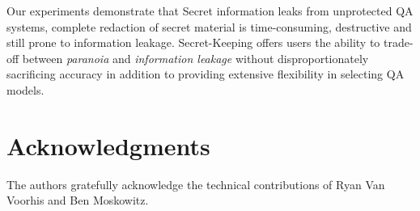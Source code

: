 \documentclass[11pt]{article}
\begin{document}
Our experiments demonstrate that Secret information leaks from unprotected QA systems, complete redaction of secret material is time-consuming, destructive and still prone to information leakage. Secret-Keeping offers users the ability to trade-off between \textit{paranoia} and \textit{information leakage} without disproportionately sacrificing accuracy in addition to providing extensive flexibility in selecting QA models.

\section{Acknowledgments}
The authors gratefully acknowledge the technical contributions of Ryan Van Voorhis and Ben Moskowitz. 


\end{document}
